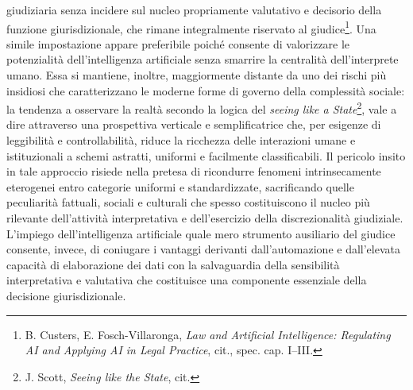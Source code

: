 \documentclass[american,a4paper,]{article}
\begin{document}
giudiziaria senza incidere sul nucleo propriamente valutativo e decisorio della funzione giurisdizionale, che rimane integralmente riservato al giudice\footnote{B. Custers, E. Fosch-Villaronga, \emph{Law and Artificial Intelligence: Regulating AI and Applying AI in Legal Practice}, cit., spec. cap. I--III.}. Una simile impostazione appare preferibile poiché consente di valorizzare le potenzialità dell'intelligenza artificiale senza smarrire la centralità dell'interprete umano. Essa si mantiene, inoltre, maggiormente distante da uno dei rischi più insidiosi che caratterizzano le moderne forme di governo della complessità sociale: la tendenza a osservare la realtà secondo la logica del \emph{seeing like a State}\footnote{J. Scott, \emph{Seeing like the State}, cit.}, vale a dire attraverso una prospettiva verticale e semplificatrice che, per esigenze di leggibilità e controllabilità, riduce la ricchezza delle interazioni umane e istituzionali a schemi astratti, uniformi e facilmente classificabili. Il pericolo insito in tale approccio risiede nella pretesa di ricondurre fenomeni intrinsecamente eterogenei entro categorie uniformi e standardizzate, sacrificando quelle peculiarità fattuali, sociali e culturali che spesso costituiscono il nucleo più rilevante dell'attività interpretativa e dell'esercizio della discrezionalità giudiziale. L'impiego dell'intelligenza artificiale quale mero strumento ausiliario del giudice consente, invece, di coniugare i vantaggi derivanti dall'automazione e dall'elevata capacità di elaborazione dei dati con la salvaguardia della sensibilità interpretativa e valutativa che costituisce una componente essenziale della decisione giurisdizionale.
\end{document}

